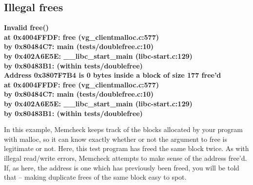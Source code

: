 \documentclass{article}
\begin{document}
\subsection{Illegal frees}
\begin{flushleft}
\textbf{Invalid free()}\\
\textbf{\hspace{15} at 0x4004FFDF: free (vg\_clientmalloc.c:577)}\\
\textbf{\hspace{15} by 0x80484C7: main (tests/doublefree.c:10)}\\
\textbf{\hspace{15} by 0x402A6E5E: \_\_libc\_start\_main (libc-start.c:129)}\\
\textbf{\hspace{15} by 0x80483B1: (within tests/doublefree)}\\
\textbf{\hspace{15} Address 0x3807F7B4 is 0 bytes inside a block of size 177 free’d}\\
\textbf{\hspace{15} at 0x4004FFDF: free (vg\_clientmalloc.c:577)}\\
\textbf{\hspace{15} by 0x80484C7: main (tests/doublefree.c:10)}\\
\textbf{\hspace{15} by 0x402A6E5E: \_\_libc\_start\_main (libc-start.c:129)}\\
\textbf{\hspace{15} by 0x80483B1: (within tests/doublefree)}
\end{flushleft}
In this example, Memcheck keeps track of the blocks allocated by your program with malloc, so it can know exactly whether or not the argument to free is legitimate or not.
Here, this test program has freed the same block twice.
As with illegal read/write errors, Memcheck attempts to make sense of the address free'd.
 If, as here, the address is one which has previously been
freed, you will be told that – making duplicate frees of the same block easy to spot.
\end{document}
